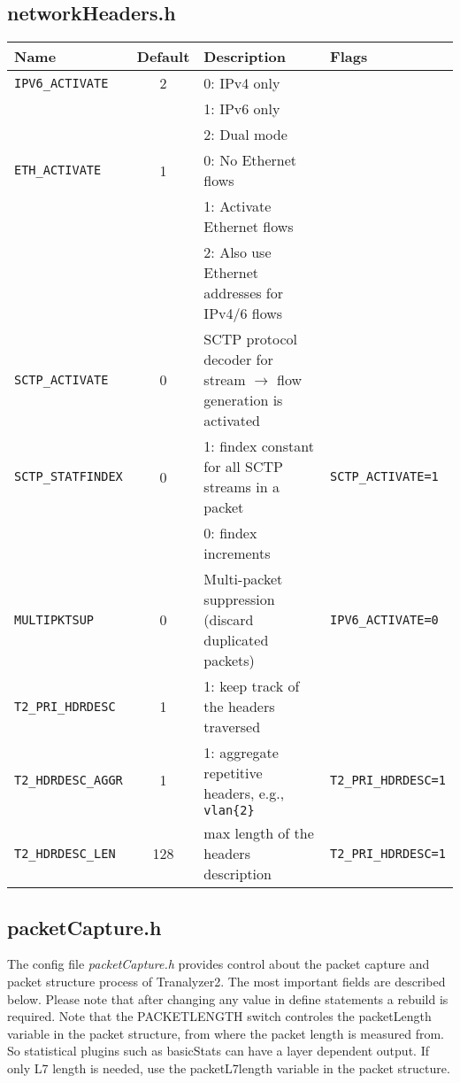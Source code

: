 \subsection{networkHeaders.h}\label{networkHeaders.h}
\begin{center}
    \begin{tabularx}{\textwidth}{lcXl}
        \toprule
        {\bf Name} & {\bf Default} & {\bf Description} & {\bf Flags}\\
        \midrule
        {\tt IPV6\_ACTIVATE}   & 2 & 0: IPv4 only\\
                               &   & 1: IPv6 only\\
                               &   & 2: Dual mode\\
        {\tt ETH\_ACTIVATE}    & 1 & 0: No Ethernet flows\\
                               &   & 1: Activate Ethernet flows\\
                               &   & 2: Also use Ethernet addresses for IPv4/6 flows\\
        {\tt SCTP\_ACTIVATE}   & 0 & SCTP protocol decoder for stream $\rightarrow$ flow generation is activated \\
        {\tt SCTP\_STATFINDEX} & 0 & 1: findex constant for all SCTP streams in a packet & {\tt SCTP\_ACTIVATE=1}\\
                               &   & 0: findex increments \\
        {\tt MULTIPKTSUP}      & 0 & Multi-packet suppression (discard duplicated packets) & {\tt IPV6\_ACTIVATE=0}\\
        {\tt T2\_PRI\_HDRDESC}  &   1 & 1: keep track of the headers traversed\\
        {\tt T2\_HDRDESC\_AGGR} &   1 & 1: aggregate repetitive headers, e.g., {\tt vlan\{2\}} & {\tt T2\_PRI\_HDRDESC=1}\\
        {\tt T2\_HDRDESC\_LEN}  & 128 & max length of the headers description & {\tt T2\_PRI\_HDRDESC=1}\\
        \bottomrule
    \end{tabularx}
\end{center}

\clearpage

\subsection{packetCapture.h}\label{packetCapture.h}
The config file {\em packetCapture.h} provides control about the packet capture and packet structure process of Tranalyzer2.
The most important fields are described below. Please note that after changing any value in define statements a rebuild is required.
Note that the PACKETLENGTH switch controles the packetLength variable in the packet structure, from where the packet length is
measured from. So statistical plugins such as basicStats can have a layer dependent output. If only L7 length is needed,
use the packetL7length variable in the packet structure.

